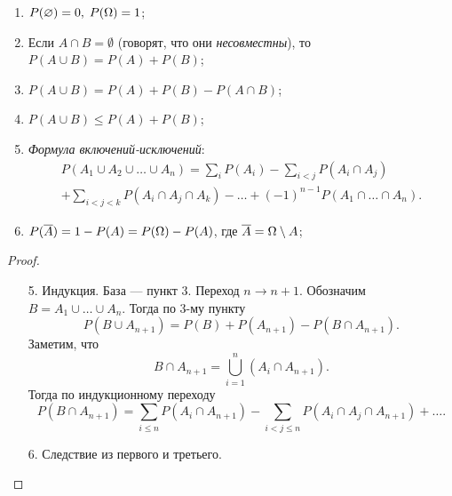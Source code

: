 \begin{properties}[вероятности]
    \begin{enumerate}
        \item $P(\varnothing) = 0, \; P(\Omega) = 1$;
        \item Если $A \cap B = \emptyset$ (говорят, что они \textit{несовместны}), то $P(A \cup B) = P(A) + P(B)$;
        \item $P(A \cup B) = P(A) + P(B) - P(A \cap B)$;
        \item $P(A \cup B) \leq P(A) + P(B)$;
        \item \textit{Формула включений-исключений}:
        \begin{multline*}
             P(A_1\cup A_2 \cup \ldots \cup A_n) = \sum_i{P(A_i)} - \sum_{i<j}P(A_i\cap A_j) \\+ \sum_{i<j<k}P(A_i\cap A_j \cap A_k) - \ldots +(-1)^{n-1}P(A_1\cap\ldots\cap A_n).
        \end{multline*}
    
        \item $P(\overline{A}) = 1 - P(A) = P(\Omega) - P(A)$, где $\overline{A} = \Omega \setminus A$;
    \end{enumerate}
\end{properties}

\begin{proof}
\begin{enumerate}
    \item[5.]Индукция. База --- пункт 3. Переход $n \to n+1$.
   Обозначим $B = A_1 \cup \ldots \cup A_n$. Тогда по 3-му пункту
    $$P(B\cup A_{n+1}) = P(B) +  P(A_{n+1}) - P(B\cap A_{n+1}).$$
   Заметим, что 
   $$B\cap A_{n+1} = \bigcup_{i=1}^n(A_i\cap A_{n+1}).$$
   Тогда по индукционному переходу
   $$P(B\cap A_{n+1}) = \sum_{i\leq n}P(A_i\cap A_{n+1}) - \sum_{i<j\leq n}P(A_i\cap A_j \cap A_{n+1}) + \ldots.$$
   \item[6.] Следствие из первого и третьего. \qedhere
\end{enumerate}
\end{proof}